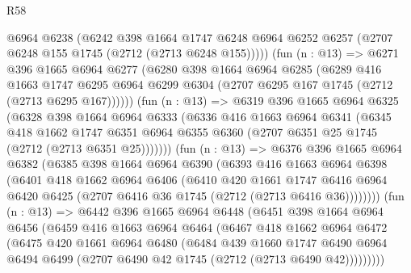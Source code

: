 \begin{lexlean}{R58}
\begin{coremodule}
          @6964
          @6238
          (@6242
            @398
            @1664
            @1747
            @6248
            @6964
            @6252
            @6257
            (@2707 @6248 @155 @1745 (@2712 (@2713 @6248 @155)))))
        (fun (n : @13) =>
        @6271
          @396
          @1665
          @6964
          @6277
          (@6280
            @398
            @1664
            @6964
            @6285
            (@6289
              @416
              @1663
              @1747
              @6295
              @6964
              @6299
              @6304
              (@2707 @6295 @167 @1745 (@2712 (@2713 @6295 @167))))))
        (fun (n : @13) =>
        @6319
          @396
          @1665
          @6964
          @6325
          (@6328
            @398
            @1664
            @6964
            @6333
            (@6336
              @416
              @1663
              @6964
              @6341
              (@6345
                @418
                @1662
                @1747
                @6351
                @6964
                @6355
                @6360
                (@2707 @6351 @25 @1745 (@2712 (@2713 @6351 @25)))))))
        (fun (n : @13) =>
        @6376
          @396
          @1665
          @6964
          @6382
          (@6385
            @398
            @1664
            @6964
            @6390
            (@6393
              @416
              @1663
              @6964
              @6398
              (@6401
                @418
                @1662
                @6964
                @6406
                (@6410
                  @420
                  @1661
                  @1747
                  @6416
                  @6964
                  @6420
                  @6425
                  (@2707 @6416 @36 @1745 (@2712 (@2713 @6416 @36))))))))
        (fun (n : @13) =>
        @6442
          @396
          @1665
          @6964
          @6448
          (@6451
            @398
            @1664
            @6964
            @6456
            (@6459
              @416
              @1663
              @6964
              @6464
              (@6467
                @418
                @1662
                @6964
                @6472
                (@6475
                  @420
                  @1661
                  @6964
                  @6480
                  (@6484
                    @439
                    @1660
                    @1747
                    @6490
                    @6964
                    @6494
                    @6499
                    (@2707 @6490 @42 @1745 (@2712 (@2713 @6490 @42)))))))))

\end{coremodule}
\end{lexlean}
